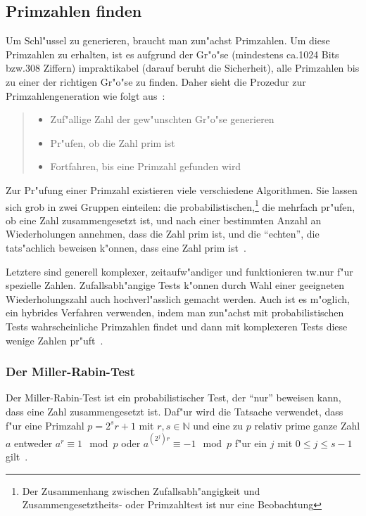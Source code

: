 \documentclass[12pt]{article}
\begin{document}
\subsection{Primzahlen finden}
\label{subsec:practical:primes}
Um Schl"ussel zu generieren, braucht man zun"achst Primzahlen.
Um diese Primzahlen zu erhalten, ist es aufgrund der Gr"o"se
(mindestens ca.\@ 1024 Bits bzw.\@ 308 Ziffern)
impraktikabel (darauf beruht die Sicherheit),
alle Primzahlen bis zu einer der richtigen Gr"o"se zu finden.
Daher sieht die Prozedur zur Primzahlengeneration wie folgt aus~\cite{hac}:
\begin{quote}
\begin{itemize}
    \item Zuf"allige Zahl der gew"unschten Gr"o"se generieren
    \item Pr"ufen, ob die Zahl prim ist
    \item Fortfahren, bis eine Primzahl gefunden wird
\end{itemize}
\end{quote}

Zur Pr"ufung einer Primzahl existieren viele verschiedene Algorithmen.
Sie lassen sich grob in zwei Gruppen einteilen:
die probabilistischen,\footnote{Der Zusammenhang zwischen Zufallsabh"angigkeit und Zusammengesetztheits-
oder Primzahltest ist nur eine Beobachtung} die mehrfach pr"ufen, ob eine Zahl zusammengesetzt ist,
und nach einer bestimmten Anzahl an Wiederholungen annehmen, dass die Zahl prim ist,
und die "`echten"', die tats"achlich beweisen k"onnen, dass eine Zahl prim ist~\cite{hac}.

Letztere sind generell komplexer, zeitaufw"andiger und funktionieren tw.\@ nur
f"ur spezielle Zahlen.
Zufallsabh"angige Tests k"onnen durch Wahl einer geeigneten Wie\-der\-hol\-ungs\-zahl
auch hochverl"asslich gemacht werden.
Auch ist es m"oglich, ein hybrides Verfahren verwenden,
indem man zun"achst mit probabilistischen Tests
wahr\-schein\-liche Primzahlen findet und dann mit komplexeren Tests
diese wenige Zahlen pr"uft~\cite{hac}.

\subsubsection{Der Miller-Rabin-Test}
\label{subsubsec:practical:primes:miller_rabin}
Der Miller-Rabin-Test ist ein probabilistischer Test, der "`nur"' beweisen kann,
dass eine Zahl zusammengesetzt ist.
Daf"ur wird die Tatsache verwendet, dass f"ur eine Primzahl $p = 2^s r+1$ mit $r, s \in \mathbb{N}$
und eine zu $p$ relativ prime ganze Zahl $a$ entweder $a^r \equiv 1 \mod p$ oder
$a^{(2^j)r} \equiv -1 \mod p$ f"ur ein $j$ mit $0 \leq j \leq s-1$ gilt~\cite{hac}.
\end{document}
